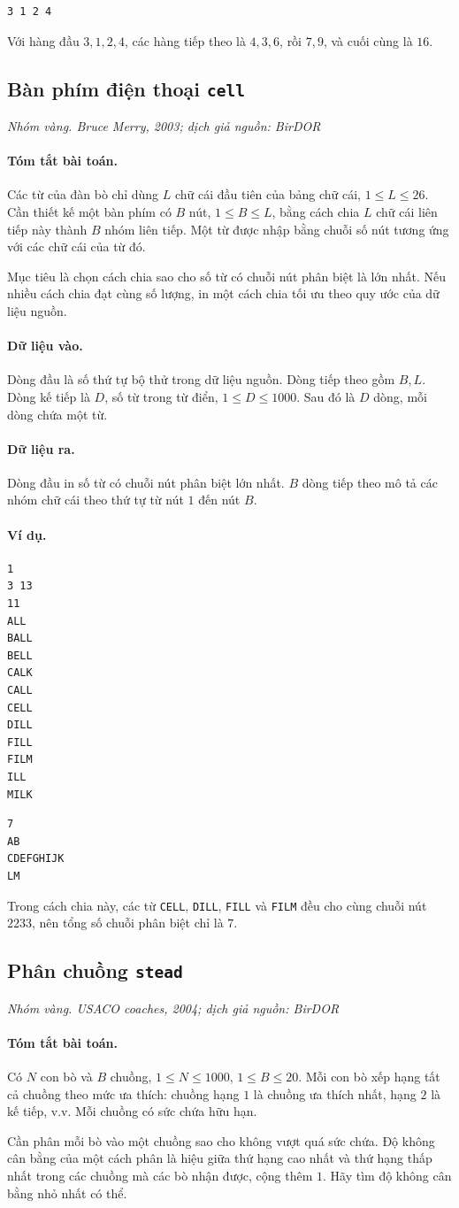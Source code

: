 \documentclass[11pt]{article}
\newcommand{\problem}[4]{%
  \subsection[#1 (#2)]{#1 \hfill {\normalsize\texttt{#2}}}%
  \noindent\textit{#3. #4}\par\smallskip
}
\newcommand{\iosec}[1]{\paragraph{#1}}
\begin{document}
\begin{verbatim}
3 1 2 4
\end{verbatim}

Với hàng đầu \(3,1,2,4\), các hàng tiếp theo là \(4,3,6\), rồi \(7,9\), và
cuối cùng là \(16\).

\problem{Bàn phím điện thoại}{cell}{Nhóm vàng}{Bruce Merry, 2003; dịch giả nguồn: BirDOR}

\iosec{Tóm tắt bài toán.}
Các từ của đàn bò chỉ dùng \(L\) chữ cái đầu tiên của bảng chữ cái,
\(1\le L\le 26\). Cần thiết kế một bàn phím có \(B\) nút,
\(1\le B\le L\), bằng cách chia \(L\) chữ cái liên tiếp này thành \(B\) nhóm
liên tiếp. Một từ được nhập bằng chuỗi số nút tương ứng với các chữ cái của
từ đó.

Mục tiêu là chọn cách chia sao cho số từ có chuỗi nút phân biệt là lớn nhất.
Nếu nhiều cách chia đạt cùng số lượng, in một cách chia tối ưu theo quy ước
của dữ liệu nguồn.

\iosec{Dữ liệu vào.}
Dòng đầu là số thứ tự bộ thử trong dữ liệu nguồn. Dòng tiếp theo gồm \(B,L\).
Dòng kế tiếp là \(D\), số từ trong từ điển, \(1\le D\le 1000\). Sau đó là
\(D\) dòng, mỗi dòng chứa một từ.

\iosec{Dữ liệu ra.}
Dòng đầu in số từ có chuỗi nút phân biệt lớn nhất. \(B\) dòng tiếp theo mô tả
các nhóm chữ cái theo thứ tự từ nút \(1\) đến nút \(B\).

\iosec{Ví dụ.}
\begin{verbatim}
1
3 13
11
ALL
BALL
BELL
CALK
CALL
CELL
DILL
FILL
FILM
ILL
MILK
\end{verbatim}

\begin{verbatim}
7
AB
CDEFGHIJK
LM
\end{verbatim}

Trong cách chia này, các từ \texttt{CELL}, \texttt{DILL}, \texttt{FILL} và
\texttt{FILM} đều cho cùng chuỗi nút \(2233\), nên tổng số chuỗi phân biệt
chỉ là \(7\).

\problem{Phân chuồng}{stead}{Nhóm vàng}{USACO coaches, 2004; dịch giả nguồn: BirDOR}

\iosec{Tóm tắt bài toán.}
Có \(N\) con bò và \(B\) chuồng, \(1\le N\le 1000\), \(1\le B\le 20\). Mỗi
con bò xếp hạng tất cả chuồng theo mức ưa thích: chuồng hạng \(1\) là chuồng
ưa thích nhất, hạng \(2\) là kế tiếp, v.v. Mỗi chuồng có sức chứa hữu hạn.

Cần phân mỗi bò vào một chuồng sao cho không vượt quá sức chứa. Độ không cân
bằng của một cách phân là hiệu giữa thứ hạng cao nhất và thứ hạng thấp nhất
trong các chuồng mà các bò nhận được, cộng thêm \(1\). Hãy tìm độ không cân
bằng nhỏ nhất có thể.
\end{document}
